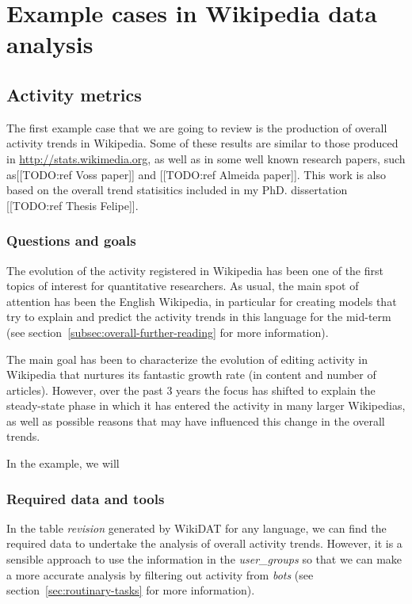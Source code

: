 \part{Example cases in Wikipedia data analysis}

\chapter{Activity metrics}

The first example case that we are going to review is the production of overall
activity trends in Wikipedia. Some of these results are similar to those produced
in \url{http://stats.wikimedia.org}, as well as in some well known research
papers, such as[[TODO:ref Voss paper]] and [[TODO:ref Almeida paper]]. This work
is also based on the overall trend statisitics included in my PhD. dissertation
[[TODO:ref Thesis Felipe]].

\section{Questions and goals}
The evolution of the activity registered in Wikipedia has been one of the first
topics of interest for quantitative researchers. As usual, the main spot of
attention has been the English Wikipedia, in particular for creating models
that try to explain and predict the activity trends in this language for the
mid-term (see section~\ref{subsec:overall-further-reading} for more information).

The main goal has been to characterize the evolution of editing activity in
Wikipedia that nurtures its fantastic growth rate (in content and number of
articles). However, over the past 3 years the focus has shifted to explain the
steady-state phase in which it has entered the activity in many larger Wikipedias,
as well as possible reasons that may have influenced this change in the overall
trends.

In the example, we will 

\section{Required data and tools}
In the table \textit{revision} generated by WikiDAT for any language, we can find
the required data to undertake the analysis of overall activity trends. However,
it is a sensible approach to use the information in the \textit{user\_groups} so that
we can make a more accurate analysis by filtering out activity from \textit{bots}
(see section~\ref{sec:routinary-tasks} for more information).

